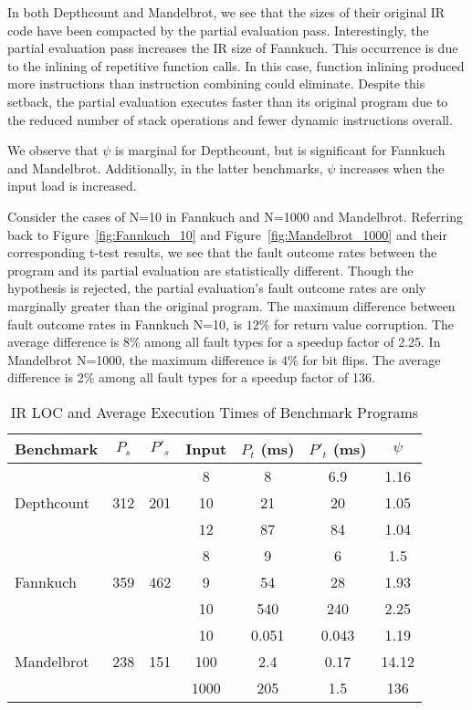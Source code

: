 In both Depthcount and Mandelbrot, we see that the sizes of their original IR code have been compacted by the partial evaluation pass.
Interestingly, the partial evaluation pass increases the IR size of Fannkuch.
This occurrence is due to the inlining of repetitive function calls.
In this case, function inlining produced more instructions than instruction combining could eliminate.
Despite this setback, the partial evaluation executes faster than its original program due to the reduced number of stack operations and fewer dynamic instructions overall. 
   
We observe that $\psi$ is marginal for Depthcount, but is significant for Fannkuch and Mandelbrot.
Additionally, in the latter benchmarks, $\psi$ increases when the input load is increased.

Consider the cases of N=10 in Fannkuch and N=1000 and Mandelbrot.
Referring back to Figure~\ref{fig:Fannkuch_10} and Figure~\ref{fig:Mandelbrot_1000} and their corresponding t-test results, we see that the fault outcome rates between the program and its partial evaluation are statistically different.
Though the hypothesis is rejected, the partial evaluation's fault outcome rates are only marginally greater than the original program.
The maximum difference between fault outcome rates in Fannkuch N=10, is $12\%$ for return value corruption.
The average difference is 8\% among all fault types for a speedup factor of 2.25. 
In Mandelbrot N=1000, the maximum difference is $4\%$ for bit flips.
The average difference is 2\% among all fault types for a speedup factor of 136. 


\begin{table}[htbp]
\small{
\begin{center}
    \begin{tabular}{|p{1.4cm}|c|c|c|c|c|c|}
    \hline
    \textbf{Benchmark} & \textbf{$P_s$} & \textbf{$P'_s$} &  \textbf{Input} & \textbf{$P_t$ (ms)} & \textbf{$P'_t$ (ms)} & $\psi$ \\ \hline
    \multirow{3}{*}{Depthcount}
    & & & 8 & 8 & 6.9 & 1.16\\
	& 312 & 201 & 10 & 21 & 20 & 1.05 \\
 	& & & 12 & 87 & 84 & 1.04 \\ \hline
 	\multirow{3}{*}{Fannkuch}
    & & & 8 & 9 & 6 & 1.5\\
	& 359 & 462 & 9 & 54 & 28 & 1.93 \\
 	& & & 10 & 540 & 240 & 2.25 \\ \hline
 	\multirow{3}{*}{Mandelbrot}
    & & & 10 & 0.051 & 0.043 & 1.19\\
	& 238 & 151 & 100 & 2.4 & 0.17 & 14.12 \\
 	& & & 1000 & 205 & 1.5 & 136 \\ \hline
    \hline
    \end{tabular}
    \end{center}
    }
    \caption{IR LOC and Average Execution Times of Benchmark Programs}
    \label{tab:benchmarks}
\end{table}


